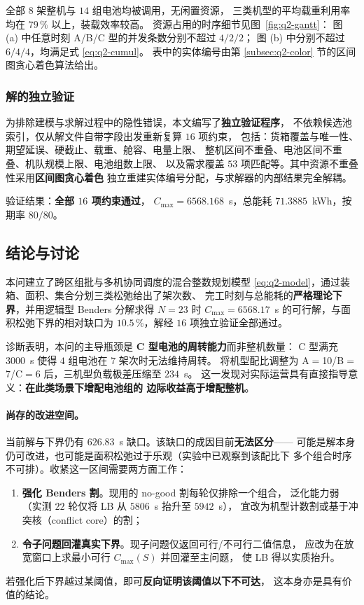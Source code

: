 全部 $8$ 架整机与 $14$ 组电池均被调用，无闲置资源，
三类机型的平均载重利用率均在 $79\,\%$ 以上，装载效率较高。
资源占用的时序细节见图~\ref{fig:q2-gantt}：
图 (a) 中任意时刻 A/B/C 型的并发条数分别不超过 $4/2/2$；
图 (b) 中分别不超过 $6/4/4$，均满足式 \eqref{eq:q2-cumul}。
表中的实体编号由第 \ref{subsec:q2-color} 节的区间图贪心着色算法给出。

\subsubsection{解的独立验证}
\label{subsec:q2-verify}

为排除建模与求解过程中的隐性错误，本文编写了\textbf{独立验证程序}，
不依赖候选池索引，仅从解文件自带字段出发重新复算 $16$ 项约束，
包括：货箱覆盖与唯一性、期望延误、硬截止、载重、舱容、电量上限、
整机区间不重叠、电池区间不重叠、机队规模上限、电池组数上限、
以及需求覆盖 $53$ 项匹配等。其中资源不重叠性采用\textbf{区间图贪心着色}
独立重建实体编号分配，与求解器的内部结果完全解耦。

验证结果：\textbf{全部 $16$ 项约束通过}，
$C_{\max}=6568.168$~s，总能耗 $71.3885$~kWh，按期率 $80/80$。

\subsection{结论与讨论}

本问建立了跨区组批与多机协同调度的混合整数规划模型
\eqref{eq:q2-model}，通过装箱、面积、集合分划三类松弛给出了架次数、
完工时刻与总能耗的\textbf{严格理论下界}，并用逻辑型 Benders 分解求得
$N=23$ 时 $C_{\max}=6568.17$~s 的可行解，与面积松弛下界的相对缺口为
$10.5\,\%$，解经 $16$ 项独立验证全部通过。

诊断表明，本问的主导瓶颈是 \textbf{C 型电池的周转能力}而非整机数量：
C 型满充 $3000$~s 使得 $4$ 组电池在 $7$ 架次时无法维持周转。
将机型配比调整为 A$=$10/B$=$7/C$=$6 后，三机型负载极差压缩至 $234$~s。
这一发现对实际运营具有直接指导意义：\textbf{在此类场景下增配电池组的
边际收益高于增配整机}。

\paragraph{尚存的改进空间。}
当前解与下界仍有 $626.83$~s 缺口。该缺口的成因目前\textbf{无法区分}——
可能是解本身仍可改进，也可能是面积松弛过于乐观（实验中已观察到该配比下
多个组合时序不可排）。收紧这一区间需要两方面工作：

\begin{enumerate}
  \item \textbf{强化 Benders 割}。现用的 no-good 割每轮仅排除一个组合，
        泛化能力弱（实测 $22$ 轮仅将 LB 从 $5806$~s 抬升至 $5942$~s），
        宜改为机型计数割或基于冲突核（conflict core）的割；
  \item \textbf{令子问题回灌真实下界}。现子问题仅返回可行/不可行二值信息，
        应改为在放宽窗口上求最小可行 $C_{\max}(S)$ 并回灌至主问题，
        使 LB 得以实质抬升。
\end{enumerate}

若强化后下界越过某阈值，即可\textbf{反向证明该阈值以下不可达}，
这本身亦是具有价值的结论。
